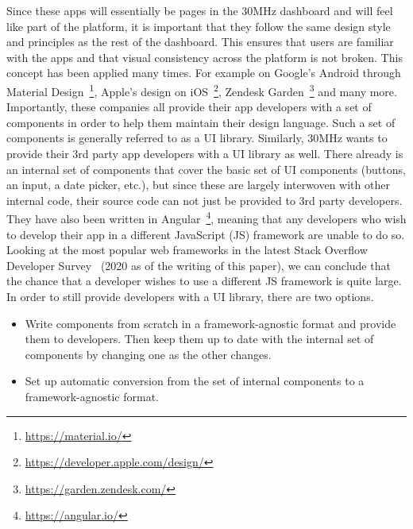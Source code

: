 Since these apps will essentially be pages in the 30MHz dashboard and will feel like part of the platform, it is important that they follow the same design style and principles as the rest of the dashboard. This ensures that users are familiar with the apps and that visual consistency across the platform is not broken. This concept has been applied many times. For example on Google's Android through Material Design~\footnote{\url{https://material.io/}}, Apple's design on iOS~\footnote{\url{https://developer.apple.com/design/}}, Zendesk Garden~\footnote{\url{https://garden.zendesk.com/}} and many more. Importantly, these companies all provide their app developers with a set of components in order to help them maintain their design language. Such a set of components is generally referred to as a UI library. Similarly, 30MHz wants to provide their 3rd party app developers with a UI library as well. There already is an internal set of components that cover the basic set of UI components (buttons, an input, a date picker, etc.), but since these are largely interwoven with other internal code, their source code can not just be provided to 3rd party developers. They have also been written in Angular~\footnote{\url{https://angular.io/}}, meaning that any developers who wish to develop their app in a different JavaScript (JS) framework are unable to do so. Looking at the most popular web frameworks in the latest Stack Overflow Developer Survey~\cite{stack-overflow-dev-survey} (2020 as of the writing of this paper), we can conclude that the chance that a developer wishes to use a different JS framework is quite large. In order to still provide developers with a UI library, there are two options.

\begin{itemize}
	\item Write components from scratch in a framework-agnostic format and provide them to developers. Then keep them up to date with the internal set of components by changing one as the other changes.
	\item Set up automatic conversion from the set of internal components to a framework-agnostic format.
\end{itemize}

